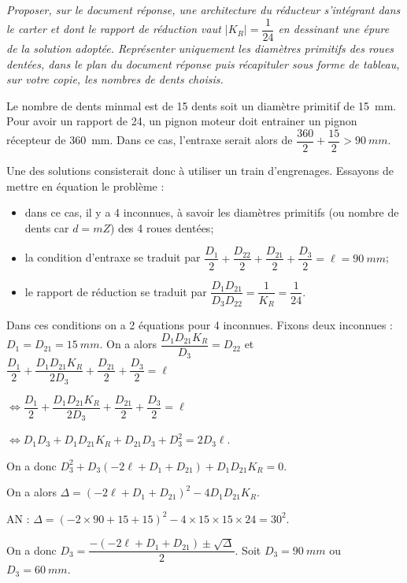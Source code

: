 \documentclass[10pt,fleqn]{article} %
\begin{document}
\subparagraph{\label{q_10}}\textit{Proposer, sur le document réponse, une architecture du réducteur s’intégrant dans le carter et dont le rapport de réduction vaut $|K_R| =\dfrac{1}{24}$ en dessinant une épure de la solution adoptée. Représenter uniquement les diamètres primitifs des roues dentées, dans le plan du document réponse puis récapituler sous forme de tableau, sur votre copie, les nombres de dents choisis.}
\ifprof
\begin{corrige}
Le nombre de dents minmal est de 15 dents soit un diamètre primitif de \SI{15}{mm}.
Pour avoir un rapport de 24, un pignon moteur doit entrainer un pignon récepteur de \SI{360}{mm}. Dans ce cas, l'entraxe serait alors de $\dfrac{360}{2}+\dfrac{15}{2} > \SI{90}{mm}$.

Une des solutions consisterait donc à utiliser un train d'engrenages. Essayons de mettre en équation le problème : 
\begin{itemize}
\item dans ce cas, il y a 4 inconnues, à savoir les diamètres primitifs (ou nombre de dents car $d=mZ$) des 4 roues dentées;
\item la condition d'entraxe se traduit par $\dfrac{D_1}{2} + \dfrac{D_{22}}{2}+ \dfrac{D_{21}}{2}+ \dfrac{D_{3}}{2} = \ell = \SI{90}{mm}$;
\item le rapport de réduction se traduit par $\dfrac{D_1 D_{21}}{D_3 D_{22}} = \dfrac{1}{K_R}= \dfrac{1}{24}$.
\end{itemize}
Dans ces conditions on a 2 équations pour 4 inconnues. Fixons deux inconnues : $D_1 =  D_{21} = \SI{15}{mm}$. 
On a alors $\dfrac{D_1 D_{21} K_R}{D_3 } = D_{22}$ et 
 $\dfrac{D_1}{2} + \dfrac{D_1 D_{21} K_R}{2D_3 }+ \dfrac{D_{21}}{2}+ \dfrac{D_{3}}{2} = \ell$

$ \Leftrightarrow  \dfrac{D_1}{2} + \dfrac{D_1 D_{21} K_R}{2D_3 }+ \dfrac{D_{21}}{2}+ \dfrac{D_{3}}{2} = \ell$

$ \Leftrightarrow  D_1 D_3  + D_1 D_{21} K_R+D_{21}D_3 + D_{3}^2 = 2 D_3\ell$.

On a donc $D_{3}^2 + D_3\left(- 2\ell + D_1+ D_{21} \right) + D_1 D_{21} K_R= 0$.

On a alors  $ \Delta  = \left(- 2\ell + D_1+ D_{21} \right)^2 - 4  D_1 D_{21} K_R$. 

AN : $\Delta = \left(- 2\times 90+ 15 + 15  \right)^2 - 4  \times 15\times 15 \times {24} = 30^2 $.

On a donc $D_3 = \dfrac{-\left(- 2\ell + D_1+ D_{21} \right)\pm\sqrt{\Delta}}{2}$.
Soit $D_3 = \SI{90}{mm}$ ou $D_3 = \SI{60}{mm}$.


\end{corrige}
\end{document}
